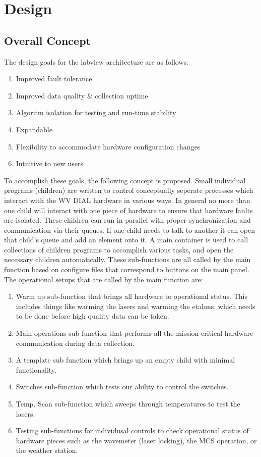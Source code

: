 
\chapter{Design}
\label{CH-Design}

\section{Overall Concept}

The design goals for the labview architecture are as follows:

\begin{enumerate}
  \item{Improved fault tolerance}
  \item{Improved data quality \& collection uptime}
  \item{Algoritm isolation for testing and run-time stability}
  \item{Expandable}
  \item{Flexibility to accommodate hardware configuration changes}  \item{Intuitive to new users}
\end{enumerate}

To accomplish these goals, the following concept is proposed. Small individual programs (children) are written to control conceptually seperate processes which interact with the WV DIAL hardware in various ways. In general no more than one child will interact with one piece of hardware to ensure that hardware faults are isolated. These children can run in parallel with proper synchronization and communication via their queues. If one child needs to talk to another it can open that child's queue and add an element onto it. A main container is used to call collections of children programs to accomplish various tasks, and open the necessary children automatically. These sub-functions are all called by the main function based on configure files that correspond to buttons on the main panel. The operational setups that are called by the main function are:

\begin{enumerate}
\item{Warm up sub-function that brings all hardware to operational status. This includes things like warming the lasers and warming the etalons, which needs to be done before high quality data can be taken.}
\item{Main operations sub-function that performs all the mission critical hardware communication during data collection.}
\item{A template sub function which brings up an empty child with minimal functionality.}
\item{Switches sub-function which tests our ability to control the switches.}
\item{Temp. Scan sub-function which sweeps through temperatures to test the lasers.}
\item{Testing sub-functions for individusal controls to check operational status of hardware pieces such as the wavemeter (laser locking), the MCS operation, or the weather station.}
\end{enumerate}

